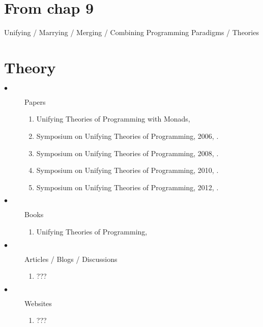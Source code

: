 \documentclass[thesis-solanki.tex]{subfiles}
\begin{document}
\section{\textbf{From chap 9}}

Unifying / Marrying / Merging / Combining Programming Paradigms / Theories
\section{Theory}
\begin{description}

\item[$\bullet$] Papers
\begin{enumerate}
\item Unifying Theories of Programming with Monads, \cite{gibbons2013unifying}

\item Symposium on Unifying Theories of Programming, 2006, \cite{DBLP:conf/utp/2006}.

\item Symposium on Unifying Theories of Programming, 2008, \cite{DBLP:conf/utp/2008}.

\item Symposium on Unifying Theories of Programming, 2010, \cite{DBLP:conf/utp/2010}.

\item Symposium on Unifying Theories of Programming, 2012, \cite{DBLP:conf/utp/2012}.

\end{enumerate}

\item[$\bullet$] Books
\begin{enumerate}
\item Unifying Theories of Programming, \cite{hoare1998unifying}
\end{enumerate}

\item[$\bullet$] Articles / Blogs / Discussions
\begin{enumerate}
\item ???
\end{enumerate}

\item[$\bullet$] Websites
\begin{enumerate}
\item ???
\end{enumerate}

\end{description}
\end{document}

